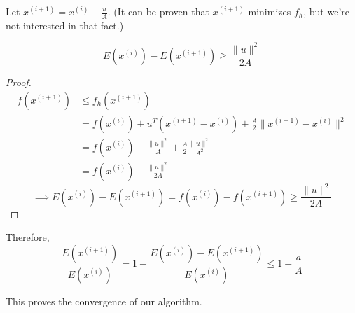 Let $x^{(i+1)} = x^{(i)} - \frac{u}{A}$.
(It can be proven that $x^{(i+1)}$ minimizes $f_h$, but we're not interested in that fact.)

\begin{lemma}
\[ E(x^{(i)}) - E(x^{(i+1)}) \ge \frac{\|u\|^2}{2A} \]
\end{lemma}
\begin{proof}
\begin{align*}
f(x^{(i+1)}) &\le f_h(x^{(i+1)})  \tag{$f_h$ upper-bounds $f$}
\\ &= f(x^{(i)}) + u^T(x^{(i+1)} - x^{(i)}) + \frac{A}{2}\|x^{(i+1)} - x^{(i)}\|^2
\\ &= f(x^{(i)}) - \frac{\|u\|^2}{A} + \frac{A}{2}\frac{\|u\|^2}{A^2}
\\ &= f(x^{(i)}) - \frac{\|u\|^2}{2A}
\end{align*}
\[ \implies E(x^{(i)}) - E(x^{(i+1)}) = f(x^{(i)}) - f(x^{(i+1)}) \ge \frac{\|u\|^2}{2A} \]
\end{proof}

Therefore,
\[ \frac{E(x^{(i+1)})}{E(x^{(i)})}
= 1 - \frac{E(x^{(i)}) - E(x^{(i+1)})}{E(x^{(i)})}
\le 1 - \frac{a}{A} \]

This proves the convergence of our algorithm.


